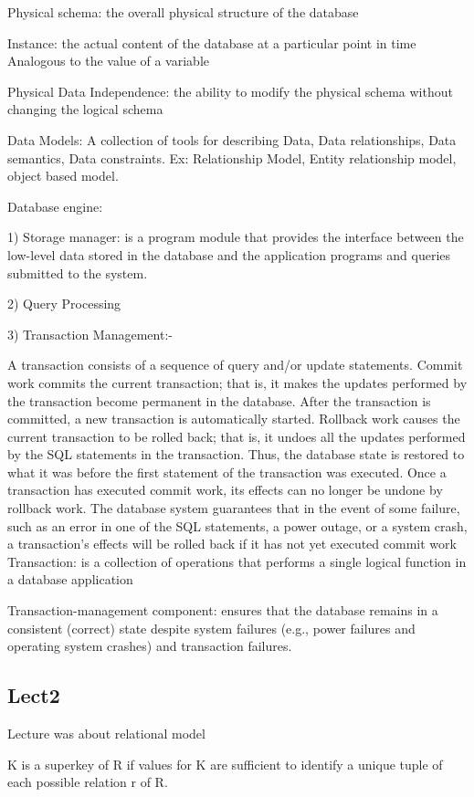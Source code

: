 \documentclass[8pt, a4paper, oneside, twocolumn]{extarticle}
\begin{document}
Physical schema: the overall physical structure of the database 

Instance: the actual content of the database at a particular point in time 
Analogous to the value of a variable

Physical Data Independence: the ability to modify the physical schema without 
changing the logical schema

Data Models: A collection of tools for describing Data, Data relationships, Data semantics, Data constraints. Ex: Relationship Model, Entity relationship model, object based model.

Database engine: 

1) Storage manager: is a program module that provides the interface between 
the low-level data stored in the database and the application programs and 
queries submitted to the system.

2) Query Processing

3) Transaction Management:- 

A transaction consists of a sequence of query and/or update statements.
Commit work commits the current transaction; that is, it makes the updates
performed by the transaction become permanent in the database. After the
transaction is committed, a new transaction is automatically started.
Rollback work causes the current transaction to be rolled back; that is, it
undoes all the updates performed by the SQL statements in the transaction.
Thus, the database state is restored to what it was before the first statement
of the transaction was executed.
Once a transaction has executed commit work, its
effects can no longer be undone by rollback work. The database system guarantees that in the event of some failure, such as an error in one of the SQL statements,
a power outage, or a system crash, a transaction’s effects will be rolled back if it
has not yet executed commit work
Transaction: is a collection of operations that performs a single 
logical function in a database application

Transaction-management component: ensures that the database 
remains in a consistent (correct) state despite system failures (e.g., 
power failures and operating system crashes) and transaction failures.
\subsection{Lect2}
Lecture was about relational model

K is a superkey of R if values for K are sufficient to identify a unique tuple of each possible relation r of R.
\end{document}

